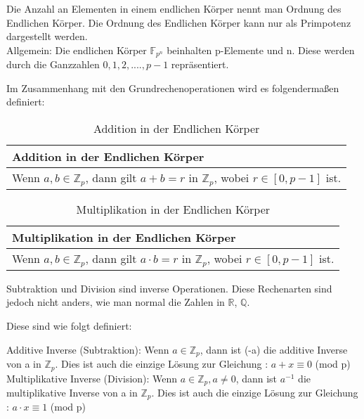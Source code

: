 Die Anzahl an Elementen in einem endlichen Körper nennt man Ordnung des Endlichen Körper. Die Ordnung des Endlichen Körper kann nur als Primpotenz dargestellt werden.\\

Allgemein: Die endlichen Körper $\mathbb{F}_{p^n}$ beinhalten p-Elemente und n. Diese werden durch die Ganzzahlen ${0,1,2,....,p-1}$ repräsentiert. 

Im Zusammenhang mit den Grundrechenoperationen wird es folgendermaßen definiert:
\begin{table}[!ht]
    \centering
        \begin{tabular}{l}
            \toprule
            \textbf{Addition in der Endlichen Körper}\\
            \midrule
            Wenn $ a, b \in \mathbb{Z}_p $, dann gilt $ a+b =r$ in $ \mathbb{Z}_p $, wobei $r \in [0, p-1]$ ist.\\
           \bottomrule
        \end{tabular}
        \caption{Addition in der Endlichen Körper}
        \label{tab3}
    \end{table}

    \begin{table}[!ht]
        \centering
            \begin{tabular}{l}
                \toprule
                \textbf{Multiplikation in der Endlichen Körper}\\
                \midrule
                Wenn $ a, b \in \mathbb{Z}_p $, dann gilt $ a \cdot b =r$ in $ \mathbb{Z}_p $, wobei $r \in [0, p-1]$ ist.\\
               \bottomrule
            \end{tabular}
            \caption{Multiplikation in der Endlichen Körper}
            \label{tab3}
        \end{table}

Subtraktion und Division sind inverse Operationen. Diese Rechenarten sind jedoch nicht anders, wie man normal die Zahlen in $\mathbb{R}$, $\mathbb{Q}$.

Diese sind wie folgt definiert:

Additive Inverse (Subtraktion): Wenn $a \in \mathbb{Z}_p$, dann ist (-a) die additive Inverse von a in $\mathbb{Z}_p$. Dies ist auch die einzige Lösung zur Gleichung : $a + x \equiv 0$ (mod p)
Multiplikative Inverse (Division): Wenn $a \in \mathbb{Z}_p, a \neq 0 $,  dann ist $a^{-1}$ die multiplikative Inverse von a in $\mathbb{Z}_p$. Dies ist auch die einzige Lösung zur Gleichung : $a \cdot x \equiv 1$ (mod p)


